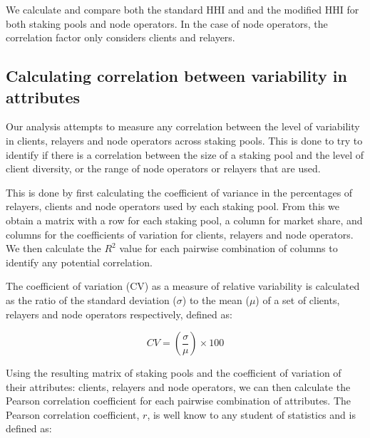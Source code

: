 \documentclass[conference]{IEEEtran}
\begin{document}

We calculate and compare both the standard HHI and and the modified HHI for both staking pools and node operators.  In the case of node operators, the correlation factor only considers clients and relayers.

\subsection{Calculating correlation between variability in attributes}

Our analysis attempts to measure any correlation between the level of variability in clients, relayers and node operators across staking pools. This is done to try to identify if there is a correlation between the size of a staking pool and the level of client diversity, or the range of node operators or relayers that are used.

This is done by first calculating the coefficient of variance in the percentages of relayers, clients and node operators used by each staking pool. From this we obtain a matrix with a row for each staking pool, a column for market share, and columns for the coefficients of variation for clients, relayers and node operators.  We then calculate the $R^2$ value for each pairwise combination of columns to identify any potential correlation.

The coefficient of variation (CV) as a measure of relative variability is calculated as the ratio of the standard deviation ($\sigma$) to the mean ($\mu$) of a set of clients, relayers and node operators respectively, defined as:

\[ CV = \left( \frac{\sigma}{\mu} \right) \times 100 \]

Using the resulting matrix of staking pools and the coefficient of variation of their attributes: clients, relayers and node operators, we can then calculate the Pearson correlation coefficient \cite{pearson1895} for each pairwise combination of attributes.  The Pearson correlation coefficient, $r$, is well know to any student of statistics and is defined as:
\end{document}
